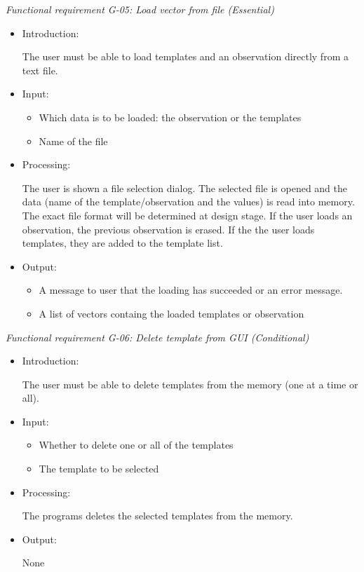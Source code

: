 \documentclass[a4paper,11pt]{article}
\begin{document}
\noindent \emph{Functional requirement G-05: Load vector from file (Essential)}
\begin{itemize}
\item Introduction:

The user must be able to load templates and an observation directly from a text file.
\item Input:
\begin{itemize}
\item Which data is to be loaded: the observation or the templates
\item Name of the file
\end{itemize}

\item Processing:

The user is shown a file selection dialog. The selected file is opened and the data (name of the template/observation and
the values) is read into memory. The exact file format will be determined at design stage. If the user loads an observation, the
previous observation is erased. If the the user loads templates, they are added to the template list.
\item Output:
\begin{itemize}
\item A message to user that the loading has succeeded or an error message.
\item A list of vectors containg the loaded templates or observation
\end{itemize}

\end{itemize}


\noindent \emph{Functional requirement G-06: Delete template from GUI (Conditional)}
\begin{itemize}
\item Introduction:

The user must be able to delete templates from the memory (one at a time or all).
\item Input:
\begin{itemize}
\item Whether to delete one or all of the templates
\item The template to be selected 
\end{itemize}

\item Processing:

The programs deletes the selected templates from the memory.
\item Output:

None
\end{itemize}
\end{document}
